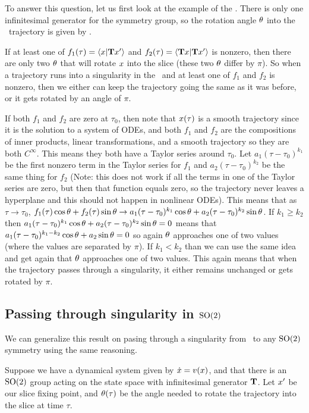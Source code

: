 {To answer this question, let us first look at the example of the \cLe. There is only one infinitesimal generator for the  symmetry group, so the rotation angle ${\bf \theta}$ into the \reducedsp\ trajectory is given by .

If at least one of $f_1(\tau)=\left\langle {\ensuremath{x}}|{\mathbf{T} x'} \right\rangle$ and $f_2(\tau)=\left\langle {\ensuremath{\mathbf{T}}\ensuremath{x}}|{\mathbf{T} x'} \right\rangle$ is nonzero, then there are only two ${\bf \theta}$ that will rotate $x$ into the slice (these two ${\bf \theta}$ differ by $\pi$). So when a trajectory runs into a singularity in the \reducedsp\ and at least one of $f_1$ and $f_2$ is nonzero, then we either can keep the trajectory going the same as it was before, or it gets rotated by an angle of $\pi$.

If both $f_1$ and $f_2$ are zero at $\tau_0$, then note that $x(\tau)$ is a smooth trajectory since it is the solution to a system of ODEs, and both $f_1$ and $f_2$ are the compositions of inner products, linear transformations, and a smooth trajectory so they are both $C^{\infty}$. This means they both have a Taylor series around $\tau_0$. Let $a_1 (\tau-\tau_0)^{k_1}$ be the first nonzero term in the Taylor series for $f_1$ and $a_2 (\tau-\tau_0)^{k_2}$ be the same thing for $f_2$ (Note: this does not work if all the terms in one of the Taylor series are zero, but then that function equals zero, so the trajectory never leaves a hyperplane and this should not happen in nonlinear ODEs). This means that as $\tau \rightarrow \tau_0$, $f_1(\tau)\cos{\bf \theta}+f_2(\tau)\sin{\bf \theta} \rightarrow a_1 (\tau-\tau_0)^{k_1}\cos{\bf \theta}+a_2 (\tau-\tau_0)^{k_2}\sin{\bf \theta}$. If $k_1 \geq k_2$ then $a_1 (\tau-\tau_0)^{k_1}\cos{\bf \theta}+a_2 (\tau-\tau_0)^{k_2}\sin{\bf \theta}=0$ means that $a_1 (\tau-\tau_0)^{k_1-k_2}\cos{\bf \theta}+a_2\sin{\bf \theta}=0$ so again ${\bf \theta}$ approaches one of two values (where the values are separated by $\pi$). If $k_1 < k_2$ than we can use the same idea and get again that ${\bf \theta}$ approaches one of two values. This again means that when the trajectory passes through a singularity, it either remains unchanged or gets rotated by $\pi$.

\subsection{Passing through singularity in $\textrm{SO}(2)$}

We can generalize this result on pasing through a singularity from \cLe\ to any $\textrm{SO}(2)$ symmetry using the same reasoning.

Suppose we have a dynamical system given by $\dot{x}=v(x)$, and that there is an $\textrm{SO}(2)$ group acting on the state space with infinitesimal generator $\mathbf{T}$. Let $x'$ be our slice fixing point, and ${\bf \theta}(\tau)$ be the angle needed to rotate the trajectory into the slice at time $\tau$.

}
